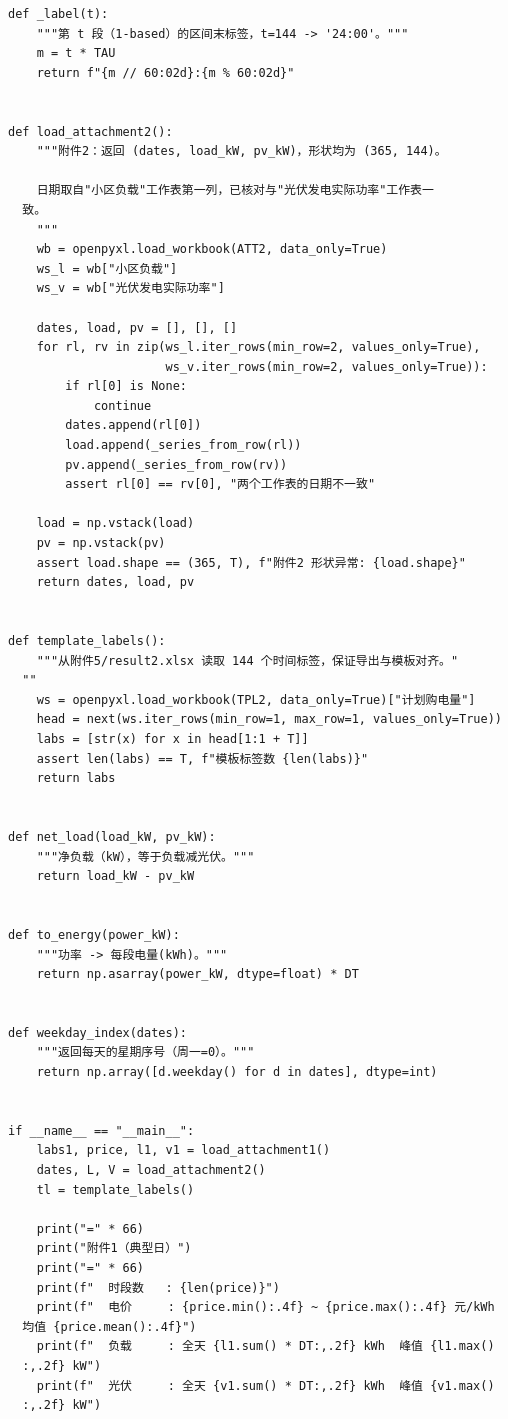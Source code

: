 \begin{verbatim}
def _label(t):
    """第 t 段（1-based）的区间末标签，t=144 -> '24:00'。"""
    m = t * TAU
    return f"{m // 60:02d}:{m % 60:02d}"


def load_attachment2():
    """附件2：返回 (dates, load_kW, pv_kW)，形状均为 (365, 144)。

    日期取自"小区负载"工作表第一列，已核对与"光伏发电实际功率"工作表一
  致。
    """
    wb = openpyxl.load_workbook(ATT2, data_only=True)
    ws_l = wb["小区负载"]
    ws_v = wb["光伏发电实际功率"]

    dates, load, pv = [], [], []
    for rl, rv in zip(ws_l.iter_rows(min_row=2, values_only=True),
                      ws_v.iter_rows(min_row=2, values_only=True)):
        if rl[0] is None:
            continue
        dates.append(rl[0])
        load.append(_series_from_row(rl))
        pv.append(_series_from_row(rv))
        assert rl[0] == rv[0], "两个工作表的日期不一致"

    load = np.vstack(load)
    pv = np.vstack(pv)
    assert load.shape == (365, T), f"附件2 形状异常: {load.shape}"
    return dates, load, pv


def template_labels():
    """从附件5/result2.xlsx 读取 144 个时间标签，保证导出与模板对齐。"
  ""
    ws = openpyxl.load_workbook(TPL2, data_only=True)["计划购电量"]
    head = next(ws.iter_rows(min_row=1, max_row=1, values_only=True))
    labs = [str(x) for x in head[1:1 + T]]
    assert len(labs) == T, f"模板标签数 {len(labs)}"
    return labs


def net_load(load_kW, pv_kW):
    """净负载（kW），等于负载减光伏。"""
    return load_kW - pv_kW


def to_energy(power_kW):
    """功率 -> 每段电量(kWh)。"""
    return np.asarray(power_kW, dtype=float) * DT


def weekday_index(dates):
    """返回每天的星期序号（周一=0）。"""
    return np.array([d.weekday() for d in dates], dtype=int)


if __name__ == "__main__":
    labs1, price, l1, v1 = load_attachment1()
    dates, L, V = load_attachment2()
    tl = template_labels()

    print("=" * 66)
    print("附件1（典型日）")
    print("=" * 66)
    print(f"  时段数   : {len(price)}")
    print(f"  电价     : {price.min():.4f} ~ {price.max():.4f} 元/kWh
  均值 {price.mean():.4f}")
    print(f"  负载     : 全天 {l1.sum() * DT:,.2f} kWh  峰值 {l1.max()
  :,.2f} kW")
    print(f"  光伏     : 全天 {v1.sum() * DT:,.2f} kWh  峰值 {v1.max()
  :,.2f} kW")


\end{verbatim}
